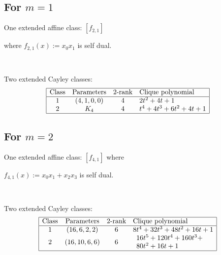 \documentclass[12pt,a4paper]{article}
\begin{document}
\subsection*{For $m=1$}

One extended affine class: $[f_{2,1}]$ 

where $f_{2,1}(x) := x_0 x_1$ is self dual.

~

Two extended Cayley classes:
\begin{align*}
\begin{array}{|cccl|}
\hline
\text{Class} &
\text{Parameters} & 
\text{2-rank} &
\text{Clique polynomial}
\\
\hline
1 &
(4, 1, 0, 0) & 4 & 
2t^{2} + 4t + 1
\\
2 &
K_4 & 4 & 
t^{4} + 4t^{3} + 6t^{2} + 4t + 1
\\
\hline
\end{array}
\end{align*}

\subsection*{For $m=2$}

One extended affine class: $[f_{4,1}]$ where 

$f_{4,1}(x) := x_0 x_1 + x_2 x_3$ is self dual.

~

Two extended Cayley classes:
\begin{align*}
\begin{array}{|cccl|}
\hline
\text{Class} &
\text{Parameters} & 
\text{2-rank} &
\text{Clique polynomial}
\\
\hline
1 &
(16, 6, 2, 2) & 
6 &
8t^{4} + 32t^{3} + 48t^{2} + 16t + 1
\\
2 &
(16, 10, 6, 6) & 
6 &
\begin{array}{l}
16t^{5} + 120t^{4} + 160t^{3} + 
\\
80t^{2} + 16t + 1
\end{array}
\\
\hline
\end{array}
\end{align*}
\end{document}
